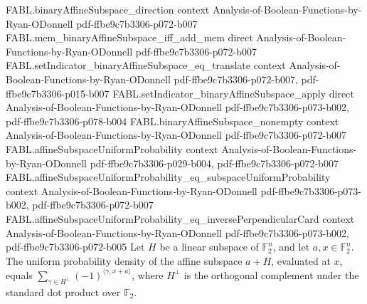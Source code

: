 \begin{theorem}
\proofstep
  {FABL.binaryAffineSubspace_direction}
  {context}
  {Analysis-of-Boolean-Functions-by-Ryan-ODonnell}
  {pdf-ffbe9c7b3306-p072-b007}
\proofstep
  {FABL.mem_binaryAffineSubspace_iff_add_mem}
  {direct}
  {Analysis-of-Boolean-Functions-by-Ryan-ODonnell}
  {pdf-ffbe9c7b3306-p072-b007}
\proofstep
  {FABL.setIndicator_binaryAffineSubspace_eq_translate}
  {context}
  {Analysis-of-Boolean-Functions-by-Ryan-ODonnell}
  {pdf-ffbe9c7b3306-p072-b007,
    pdf-ffbe9c7b3306-p015-b007}
\proofstep
  {FABL.setIndicator_binaryAffineSubspace_apply}
  {direct}
  {Analysis-of-Boolean-Functions-by-Ryan-ODonnell}
  {pdf-ffbe9c7b3306-p073-b002,
    pdf-ffbe9c7b3306-p078-b004}
\proofstep
  {FABL.binaryAffineSubspace_nonempty}
  {context}
  {Analysis-of-Boolean-Functions-by-Ryan-ODonnell}
  {pdf-ffbe9c7b3306-p072-b007}
\proofstep
  {FABL.affineSubspaceUniformProbability}
  {context}
  {Analysis-of-Boolean-Functions-by-Ryan-ODonnell}
  {pdf-ffbe9c7b3306-p029-b004,
    pdf-ffbe9c7b3306-p072-b007}
\proofstep
  {FABL.affineSubspaceUniformProbability_eq_subspaceUniformProbability}
  {context}
  {Analysis-of-Boolean-Functions-by-Ryan-ODonnell}
  {pdf-ffbe9c7b3306-p073-b002,
    pdf-ffbe9c7b3306-p072-b007}
\proofstep
  {FABL.affineSubspaceUniformProbability_eq_inversePerpendicularCard}
  {context}
  {Analysis-of-Boolean-Functions-by-Ryan-ODonnell}
  {pdf-ffbe9c7b3306-p073-b002,
    pdf-ffbe9c7b3306-p072-b005}
Let $H$ be a linear subspace of $\mathbb{F}_2^n$, and let $a,x\in\mathbb{F}_2^n$. The
uniform probability density of the affine subspace $a+H$, evaluated at $x$, equals
$\sum_{\gamma\in H^\perp}(-1)^{\langle\gamma,x+a\rangle}$, where $H^\perp$ is the
orthogonal complement under the standard dot product over $\mathbb{F}_2$.
\end{theorem}

